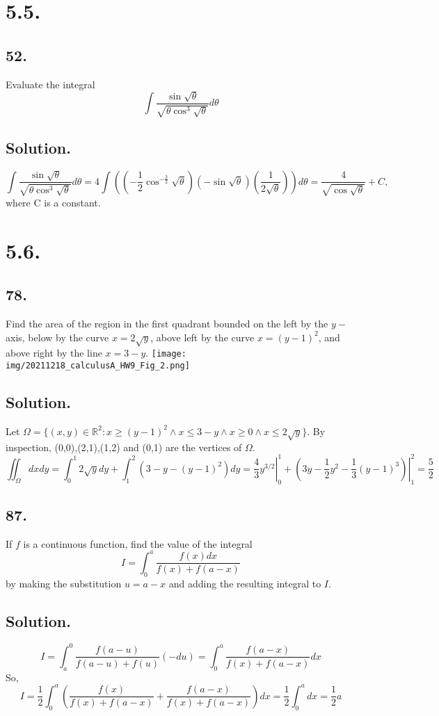 \documentclass{article}
\begin{document}
\section*{5.5.}
\subsection*{52.}
Evaluate the integral
\[\int \frac{\sin\sqrt{\theta}}{\sqrt{\theta\cos^3\sqrt{\theta}}}d\theta\]
\subsection*{Solution.}
\[\int\frac{\sin\sqrt{\theta}}{\sqrt{\theta\cos^3\sqrt{\theta}}}d\theta=4\int\left(\left(-\frac{1}{2}\cos^{-\frac{3}{2}}\sqrt{\theta}\right)(-\sin\sqrt{\theta})\left(\frac{1}{2\sqrt{\theta}}\right)\right)d\theta=\frac{4}{\sqrt{\cos\sqrt{\theta}}}+C, \]
where C is a constant.
\section*{5.6.}
\subsection*{78.}
Find the area of the region in the first quadrant bounded on the left by the $y-$axis, below by the curve $x=2\sqrt{y}$, above left by the curve $x=(y-1)^2$, and above right by the line $x=3-y$.\newline
\texttt{[image: img/20211218\_calculusA\_HW9\_Fig\_2.png]}
\subsection*{Solution.}
Let $\Omega=\{(x,y)\in\mathbb{R}^2:x\geq (y-1)^2\land x\leq 3-y\land x\geq 0\land x\leq 2\sqrt{y}\}$.\newline
By inspection, (0,0),(2,1),(1,2) and (0,1) are the vertices of $\Omega$.
\[\iint_\Omega dxdy=\int_0^1 2\sqrt{y}dy+\int _1^2 (3-y-(y-1)^2)dy=\left.\frac{4}{3}y^{3/2}\right|_0^1+\left.\left(3y-\frac{1}{2}y^2-\frac{1}{3}(y-1)^3\right)\right|_1^2=\frac{5}{2}\]
\subsection*{87.}
If $f$ is a continuous function, find the value of the integral
\[I=\int _0^a \frac{f(x)dx}{f(x)+f(a-x)}\]
by making the substitution $u=a-x$ and adding the resulting integral to $I$.
\subsection*{Solution.}
\[I=\int_a^0\frac{f(a-u)}{f(a-u)+f(u)}(-du)=\int_0^a\frac{f(a-x)}{f(x)+f(a-x)}dx\]
So,
\[I=\frac{1}{2}\int_0^a\left(\frac{f(x)}{f(x)+f(a-x)}+\frac{f(a-x)}{f(x)+f(a-x)}\right)dx=\frac{1}{2}\int_0^a dx=\frac{1}{2}a\]
\end{document}
